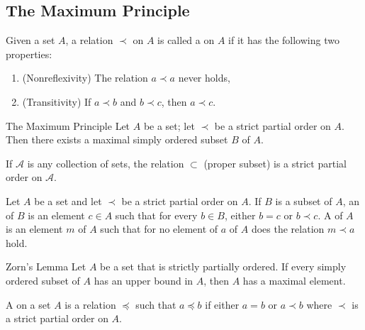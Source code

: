 \documentclass[12pt, a4paper, twoside, openright, titlepage]{book}
\begin{document}
\begin{appendices}
    \section{The Maximum Principle}

    \begin{defn}{}{}
        Given a set $A$, a relation $\prec$ on $A$ is called a  on $A$ if it has the following two properties: \begin{enumerate}
            \item (Nonreflexivity) The relation $a \prec a$ never holds,
            \item (Transitivity) If $a \prec b$ and $b \prec c$, then $a \prec c$.
        \end{enumerate}
    \end{defn}

    \begin{namthm}{The Maximum Principle}{}
        Let $A$ be a set; let $\prec$ be a strict partial order on $A$. Then there exists a maximal simply ordered subset $B$ of $A$.
    \end{namthm}


    \begin{eg}{}{}
        If $\mathscr{A}$ is any collection of sets, the relation $\subset$ (proper subset) is a strict partial order on $\mathscr{A}$. 
    \end{eg}

    \begin{defn}{}{}
        Let $A$ be a set and let $\prec$ be a strict partial order on $A$. If $B$ is a subset of $A$, an  of $B$ is an element $c \in A$ such that for every $b \in B$, either $b = c$ or $b \prec c$. A  of $A$ is an element $m$ of $A$ such that for no element of $a$ of $A$ does the relation $m \prec a$ hold.
    \end{defn}

    \begin{cust*}[separator sign={}]{Zorn's Lemma}{}
        Let $A$ be a set that is strictly partially ordered. If every simply ordered subset of $A$ has an upper bound in $A$, then $A$ has a maximal element.
    \end{cust*}

    \begin{rmk}{}{}
        A  on a set $A$ is a relation $\preceq$ such that $a \preceq b$ if either $a = b$ or $a \prec b$ where $\prec$ is a strict partial order on $A$.
    \end{rmk}






\end{appendices}
\end{document}
